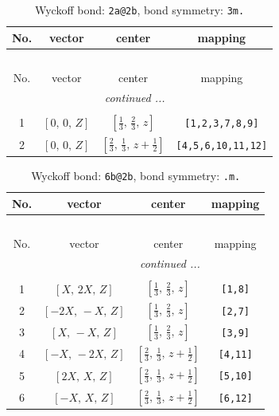 \documentclass[fleqn,8pt]{jsarticle}
\begin{document}
\renewcommand{\arraystretch}{1.2}
\begin{longtable}{cccc}
\caption{Wyckoff bond: {\tt 2a@2b}, bond symmetry: {\tt 3m.}}
 \\
 \hline \hline
No. & vector & center & mapping \\ \hline \endfirsthead

\multicolumn{3}{l}{\tablename\ \thetable{}} \\
 \hline \hline
No. & vector & center & mapping \\ \hline \endhead

 \hline \hline
\multicolumn{3}{r}{\footnotesize\it continued ...} \\ \endfoot

 \hline \hline
\multicolumn{3}{r}{} \\ \endlastfoot

1 & $\left[ 0,\, 0,\, Z \right]$ & $\left[ \frac{1}{3},\, \frac{2}{3},\, z \right]$ & {\tt [1,2,3,7,8,9]} \\ \hline
2 & $\left[ 0,\, 0,\, Z \right]$ & $\left[ \frac{2}{3},\, \frac{1}{3},\, z + \frac{1}{2} \right]$ & {\tt [4,5,6,10,11,12]} \\
\end{longtable}
\renewcommand{\arraystretch}{1.2}
\begin{longtable}{cccc}
\caption{Wyckoff bond: {\tt 6b@2b}, bond symmetry: {\tt .m.}}
 \\
 \hline \hline
No. & vector & center & mapping \\ \hline \endfirsthead

\multicolumn{3}{l}{\tablename\ \thetable{}} \\
 \hline \hline
No. & vector & center & mapping \\ \hline \endhead

 \hline \hline
\multicolumn{3}{r}{\footnotesize\it continued ...} \\ \endfoot

 \hline \hline
\multicolumn{3}{r}{} \\ \endlastfoot

1 & $\left[ X,\, 2 X,\, Z \right]$ & $\left[ \frac{1}{3},\, \frac{2}{3},\, z \right]$ & {\tt [1,8]} \\ \hline
2 & $\left[ - 2 X,\, - X,\, Z \right]$ & $\left[ \frac{1}{3},\, \frac{2}{3},\, z \right]$ & {\tt [2,7]} \\ \hline
3 & $\left[ X,\, - X,\, Z \right]$ & $\left[ \frac{1}{3},\, \frac{2}{3},\, z \right]$ & {\tt [3,9]} \\ \hline
4 & $\left[ - X,\, - 2 X,\, Z \right]$ & $\left[ \frac{2}{3},\, \frac{1}{3},\, z + \frac{1}{2} \right]$ & {\tt [4,11]} \\ \hline
5 & $\left[ 2 X,\, X,\, Z \right]$ & $\left[ \frac{2}{3},\, \frac{1}{3},\, z + \frac{1}{2} \right]$ & {\tt [5,10]} \\ \hline
6 & $\left[ - X,\, X,\, Z \right]$ & $\left[ \frac{2}{3},\, \frac{1}{3},\, z + \frac{1}{2} \right]$ & {\tt [6,12]} \\
\end{longtable}
\end{document}
